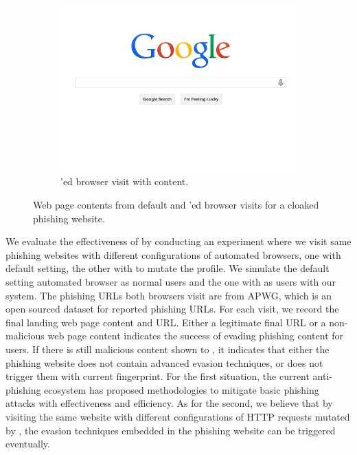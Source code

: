 \begin{figure}
\begin{subfigure}[tb]{.31\textwidth}
		\includegraphics[width=\linewidth]{figs/netflix_sp2.png}
        \caption{\spartacus'ed browser visit with content.}
        \label{fig:sp2}
	\end{subfigure}%
	\quad
	\caption{Web page contents from default and \spartacus'ed browser visits for a cloaked phishing website.}
	\label{fig:effectiveness}
\end{figure}

We evaluate the effectiveness of \spartacus by conducting an experiment where we visit same phishing websites with different configurations of automated browsers, one with default setting, the other with \spartacus to mutate the profile.
We simulate the default setting automated browser as normal users and the one with \spartacus as users with our system.
The phishing URLs both browsers visit are from APWG, which is an open sourced dataset for reported phishing URLs.
For each visit, we record the final landing web page content and URL.
Either a legitimate final URL or a non-malicious web page content indicates the success of \spartacus evading phishing content for users.
If there is still malicious content shown to \spartacus, it indicates that either the phishing website does not contain advanced evasion techniques, or \spartacus does not trigger them with current fingerprint.
For the first situation, the current anti-phishing ecosystem has proposed methodologies to mitigate basic phishing attacks with effectiveness and efficiency.
As for the second, we believe that by visiting the same website with different configurations of HTTP requests mutated by \spartacus, the evasion techniques embedded in the phishing website can be triggered eventually. 

